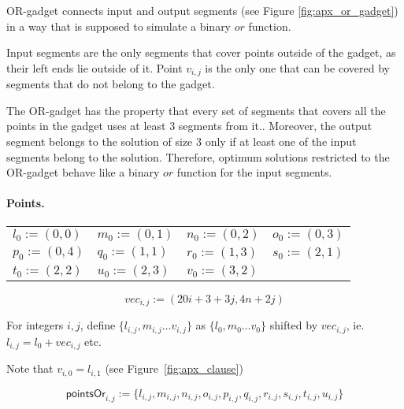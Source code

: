 OR-gadget connects input and output segments (see Figure \ref{fig:apx_or_gadget})
in a way that is supposed to simulate a binary $or$ function.

Input segments are the only segments that cover points outside of the gadget,
as their left ends lie outside of it.
Point $v_{i,j}$ is the only one that can be covered
by segments that do not belong to the gadget.

The OR-gadget has the property that every set of segments
that covers all the points in the gadget uses at least 3 segments from it..
Moreover, the output segment belongs to the solution of size 3
only if at least one of the input segments belong to the solution.
Therefore, optimum solutions restricted to the OR-gadget behave
like a binary $or$ function for the input segments.


\paragraph{Points.}

\newcommand{\chooseOr}[3]{\mathsf{chooseOr}^{#1}_{#2,#3}}
\newcommand{\orMoveVariable}[2]{\mathsf{orMoveVariable}_{#1,#2}}
\newcommand{\pointsOr}[2]{\mathsf{pointsOr}_{#1,#2}}
\newcommand{\segmentsOr}[2]{\mathsf{segmentsOr}_{#1,#2}}



\newcommand{\clauseXFactor}{20}

\begin{center}
	\begin{tabular}{ l l l l}
		$l_0 := (0, 0)$ &
		$m_0 := (0, 1)$ &
		$n_0 := (0, 2)$ &
		$o_0 := (0, 3)$ \\
		$p_0 := (0, 4)$ &
		$q_0 := (1, 1)$ &
		$r_0 := (1, 3)$ &
		$s_0 := (2, 1)$ \\
		$t_0 := (2, 2)$ &
		$u_0 := (2, 3)$ &
		$v_0 := (3, 2)$ &
	\end{tabular}
\end{center}


$$vec_{i, j} := (\clauseXFactor i + 3 + 3j, 4n + 2j)$$

For integers $i,j$,
define 
$\{ l_{i, j}, m_{i, j} \ldots v_{i, j} \}$
as $\{l_0, m_0 \ldots v_0\}$ shifted by $vec_{i, j}$,
ie. $l_{i,j} = l_0 + vec_{i,j}$ etc.

Note that $v_{i, 0} = l_{i, 1}$ (see Figure~\ref{fig:apx_clause})
 
$$\pointsOr{i}{j} := 
 \{l_{i, j}, m_{i, j}, n_{i, j}, o_{i, j},
 p_{i, j}, q_{i, j}, r_{i, j}, s_{i, j}, t_{i, j}, u_{i, j} \}
 $$
 

